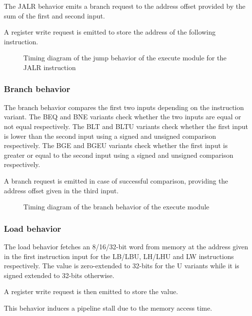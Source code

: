 \begin{content}
    The JALR behavior emits a branch request to the address offset provided by the sum of the first and second input.
    
    A register write request is emitted to store the address of the following instruction.
\end{content}

\begin{figure}[H]
    \centering
    
    \caption{Timing diagram of the jump behavior of the execute module for the JALR instruction}
    \label{fig:exm-behavior-jump-jalr}
\end{figure}

\subsubsection{Branch behavior}

\begin{content}
    The branch behavior compares the first two inputs depending on the instruction variant. The BEQ and BNE variants check whether the two inputs are equal or not equal respectively. The BLT and BLTU variants check whether the first input is lower than the second input using a signed and unsigned comparison respectively. The BGE and BGEU variants check whether the first input is greater or equal to the second input using a signed and unsigned comparison respectively.
    
    A branch request is emitted in case of successful comparison, providing the address offset given in the third input.
\end{content}

\begin{figure}[H]
    \centering
    
    \caption{Timing diagram of the branch behavior of the execute module}
    \label{fig:exm-behavior-branch}
\end{figure}



\subsubsection{Load behavior}

\begin{content}
    The load behavior fetches an 8/16/32-bit word from memory at the address given in the first instruction input for the LB/LBU, LH/LHU and LW instructions respectively. The value is zero-extended to 32-bits for the U variants while it is signed extended to 32-bits otherwise. 
    
    A register write request is then emitted to store the value. 
    
    This behavior induces a pipeline stall due to the memory access time.
\end{content}

